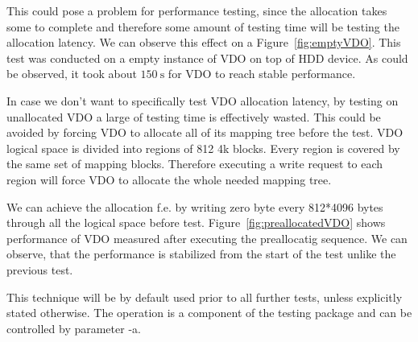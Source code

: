 \documentclass[
  color, %
  table, %
  lof,   %
  lot,   %
]{fithesis3}
\begin{document}
This could pose a problem for performance testing, since the allocation takes some to complete and therefore some amount of testing time will be testing the allocation latency. We can observe this effect on a Figure~\ref{fig:emptyVDO}. This test was conducted on a empty instance of VDO on top of HDD device. As could be observed, it took about $\SI{150}{\second}$ for VDO to reach stable performance.

In case we don't want to specifically test VDO allocation latency, by testing on unallocated VDO a large of testing time is effectively wasted. This could be avoided by forcing VDO to allocate all of its mapping tree before the test. VDO logical space is divided into regions of 812 4k blocks. Every region is covered by the same set of mapping blocks. Therefore executing a write request to each region will force VDO to allocate the whole needed mapping tree. 

We can achieve the allocation f.e. by writing zero byte every 812*4096 bytes through all the logical space before test. Figure~\ref{fig:preallocatedVDO} shows performance of VDO measured after executing the preallocatig sequence. We can observe, that the performance is stabilized from the start of the test unlike the previous test.

This technique will be by default used prior to all further tests, unless explicitly stated otherwise. The operation is a component of the testing package and can be controlled by parameter -a.
\end{document}
